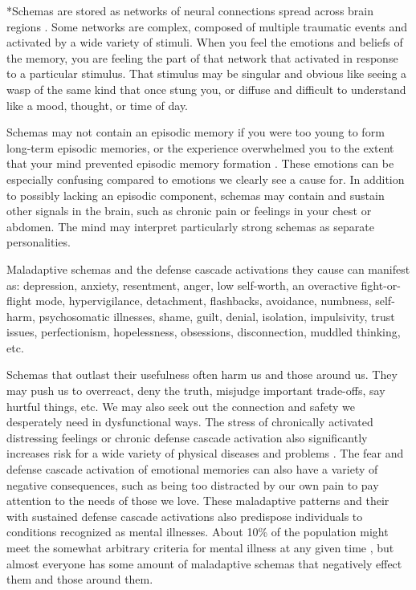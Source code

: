 \documentclass[12pt,letterpaper]{article}
\begin{document}
*Schemas are stored as networks of neural connections spread across brain regions \cite{eckerUnlocking}. Some networks are complex, composed of multiple traumatic events and activated by a wide variety of stimuli. When you feel the emotions and beliefs of the memory, you are feeling the part of that network that activated in response to a particular stimulus. That stimulus may be singular and obvious like seeing a wasp of the same kind that once stung you, or diffuse and difficult to understand like a mood, thought, or time of day. 

Schemas may not contain an episodic memory if you were too young to form long-term episodic memories, or the experience overwhelmed you to the extent that your mind prevented episodic memory formation \cite{vanderKolkBody,brownAttachmentDisturbances}. These emotions can be especially confusing compared to emotions we clearly see a cause for. In addition to possibly lacking an episodic component, schemas may contain and sustain other signals in the brain, such as chronic pain or feelings in your chest or abdomen. The mind may interpret particularly strong schemas as separate personalities.

Maladaptive schemas and the defense cascade activations they cause can manifest as: depression, anxiety, resentment, anger, low self-worth, an overactive fight-or-flight mode, hypervigilance, detachment, flashbacks, avoidance, numbness, self-harm, psychosomatic illnesses, shame, guilt, denial, isolation, impulsivity, trust issues, perfectionism, hopelessness, obsessions, disconnection, muddled thinking, etc. 

Schemas that outlast their usefulness often harm us and those around us. They may push us to overreact, deny the truth, misjudge important trade-offs, say hurtful things, etc. We may also seek out the connection and safety we desperately need in dysfunctional ways. The stress of chronically activated distressing feelings or chronic defense cascade activation also significantly increases risk for a wide variety of physical diseases and problems \cite{felittiACE}.  The fear and defense cascade activation of emotional memories can also have a variety of negative consequences, such as being too distracted by our own pain to pay attention to the needs of those we love. These maladaptive patterns and their with sustained defense cascade activations also predispose individuals to conditions recognized as mental illnesses. About 10\% of the population might meet the somewhat arbitrary criteria for mental illness at any given time \cite{whoMentalHealth}, but almost everyone has some amount of maladaptive schemas that negatively effect them and those around them.
\end{document}
